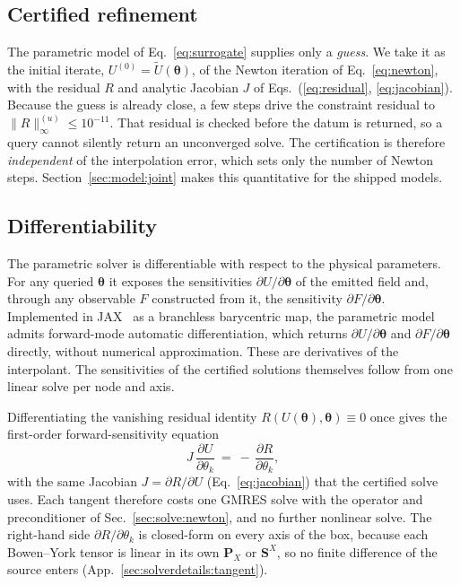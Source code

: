 \documentclass[
  aps,
  prd,
  twocolumn,
  10pt,
  amsmath,
  amssymb,
  nofootinbib,
  superscriptaddress,
  floatfix,
]{revtex4-2}
\newcommand{\vect}[1]{\boldsymbol{#1}}
\begin{document}
\subsection{Certified refinement}
\label{sec:polish}
The parametric model of Eq.~\eqref{eq:surrogate} supplies only a \emph{guess}.
We take it as the initial iterate, $U^{(0)} = \tilde U(\vect{\theta})$, of the Newton iteration of Eq.~\eqref{eq:newton}, with the residual $R$ and analytic Jacobian $J$ of Eqs.~(\ref{eq:residual}, \ref{eq:jacobian}).
Because the guess is already close, a few steps drive the constraint residual to $\|R\|^{(u)}_\infty \le 10^{-11}$.
That residual is checked before the datum is returned, so a query cannot silently return an unconverged solve.
The certification is therefore \emph{independent} of the interpolation error, which sets only the number of Newton steps.
Section~\ref{sec:model:joint} makes this quantitative for the
shipped models.


\subsection{Differentiability}
\label{sec:param:diff}

The parametric solver is differentiable with respect to the physical parameters.
For any queried $\vect{\theta}$ it exposes the sensitivities $\partial U/\partial\vect{\theta}$ of the emitted field and, through any observable $F$ constructed from it, the sensitivity $\partial F/\partial\vect{\theta}$.
Implemented in JAX~\cite{Jax2018} as a
branchless barycentric map, the parametric model admits forward-mode automatic
differentiation, which returns $\partial U/\partial\vect{\theta}$ and
$\partial F/\partial\vect{\theta}$ directly, without numerical approximation.
These are derivatives of the interpolant.
The sensitivities of the certified solutions themselves follow from one linear solve per node and axis.

Differentiating the vanishing residual identity $R(U(\vect{\theta}),\vect{\theta})\equiv0$ once gives the
first-order forward-sensitivity equation
\begin{equation}
  J\,\frac{\partial U}{\partial\theta_k} \ = \ -\,\frac{\partial R}{\partial\theta_k},
  \label{eq:tangent}
\end{equation}
with the same Jacobian $J=\partial R/\partial U$ (Eq.~\ref{eq:jacobian}) that the
certified solve uses.
Each tangent therefore costs one GMRES solve with the operator and preconditioner of Sec.~\ref{sec:solve:newton}, and no further nonlinear solve.
The right-hand side $\partial R/\partial\theta_k$ is closed-form on every axis of the box, because each Bowen--York tensor is linear in its own $\vect{P}_X$ or $\vect{S}^{X}$, so no finite difference of the source enters (App.~\ref{sec:solverdetails:tangent}).
\end{document}
